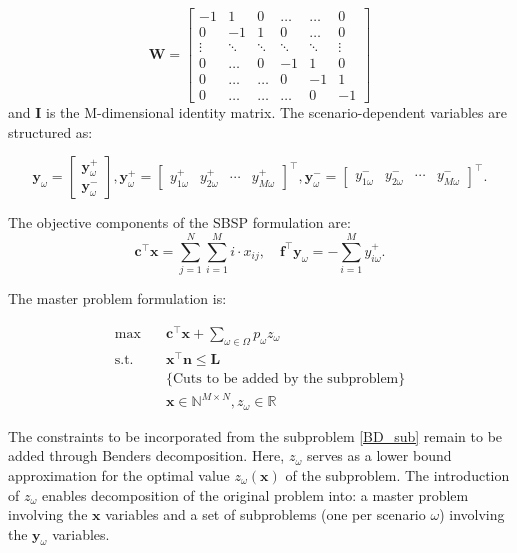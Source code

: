 $$
\mathbf{W}=\left[\begin{array}{cccccc}
-1 & 1 & 0 & \ldots & \ldots & 0 \\
0 & -1 & 1 &    0   & \ldots & 0 \\
\vdots & \ddots & \ddots & \ddots & \ddots & \vdots \\
0  & \ldots   &  0  & -1 & 1 & 0 \\
0  & \ldots   &  \ldots  &  0 &  -1 & 1 \\
0 & \ldots & \ldots & \ldots & 0 & -1
\end{array}\right]
$$
and $\mathbf{I}$ is the M-dimensional identity matrix. The scenario-dependent variables are structured as:

$$
\mathbf{y}_{\omega}=\left[\begin{array}{l}
\mathbf{y}_{\omega}^{+} \\
\mathbf{y}_{\omega}^{-}
\end{array}\right], \mathbf{y}_{\omega}^{+}=\left[\begin{array}{lllll}y_{1 \omega}^{+} & y_{2 \omega}^{+} & \cdots & y_{M \omega}^{+}\end{array}\right]^{\intercal}, \mathbf{y}_{\omega}^{-}=\left[\begin{array}{llll}y_{1 \omega}^{-} & y_{2 \omega}^{-} & \cdots & y_{M \omega}^{-}\end{array}\right]^{\intercal}.
$$

The objective components of the SBSP formulation are: $$\mathbf{c}^{\intercal}\mathbf{x} = \sum_{j =1}^{N} \sum_{i=1}^M i \cdot x_{ij}, \quad \mathbf{f}^{\intercal}\mathbf{y}_{\omega} = -\sum_{i=1}^{M} y_{i \omega}^{+}.$$ 

The master problem formulation is:

\begin{equation}\label{BD_master1}
  \begin{aligned}
    \max \quad & \mathbf{c}^{\intercal} \mathbf{x} + \sum_{\omega \in \Omega} p_{\omega} z_{\omega} \\
    \text {s.t.} \quad & \mathbf{x}^{\intercal} \mathbf{n}  \leq \mathbf{L} \\
    & \{\text{Cuts to be added by the subproblem} \} \\
    & \mathbf{x} \in \mathbb{N}^{M \times N}, z_{\omega} \in \mathbb{R}
  \end{aligned}
\end{equation}

The constraints to be incorporated from the subproblem \eqref{BD_sub} remain to be added through Benders decomposition. Here, $z_{\omega}$ serves as a lower bound approximation for the optimal value 
$z_{\omega}(\mathbf{x})$ of the subproblem. The introduction of $z_{\omega}$ enables decomposition of the original problem into: a master problem involving the $\mathbf{x}$ variables and a set of subproblems (one per scenario $\omega$) involving the $\mathbf{y}_{\omega}$ variables.

